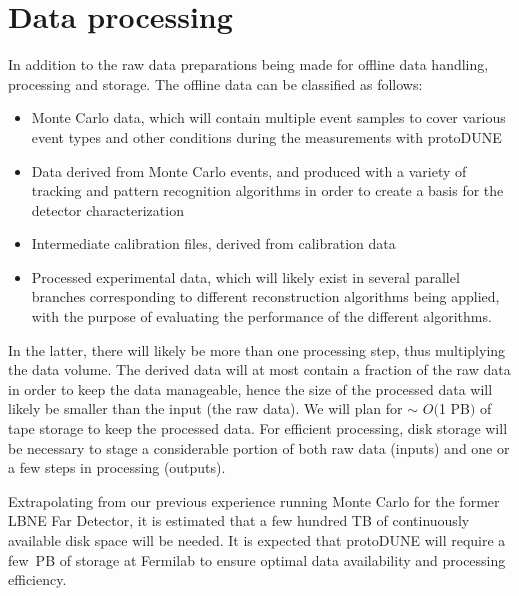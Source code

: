 \documentclass[12pt]{article}
\begin{document}
\section{Data processing}
\label{sec:protodune-dataprocess}

In addition to the raw data preparations being made for offline data handling, processing and storage.
The offline data can be classified as follows:
\begin{itemize}
\item Monte Carlo data, which will contain multiple event samples to cover various event types and other conditions during the measurements
with protoDUNE

\item Data derived from Monte Carlo events, and produced with a variety of tracking and pattern recognition algorithms
in order to create a basis for the detector characterization

\item Intermediate calibration files, derived from calibration data

\item Processed experimental data, which will likely exist in several parallel branches corresponding to different reconstruction
algorithms being applied, with the purpose of evaluating the performance of the different algorithms.
\end{itemize}

\noindent In the latter, there will likely be more than one processing step, thus multiplying the data volume. 
The derived data will at most contain a fraction of the raw data in order to keep the data manageable,
hence the size of the processed data will likely be smaller than the input (the raw data). 
We will plan for $\sim$ $O($1 PB$)$ of tape storage to keep the processed data. 
For efficient processing, disk storage will be necessary to stage a considerable portion of both raw
data (inputs) and one or a few steps in processing (outputs).

Extrapolating from our previous experience running Monte Carlo for the former LBNE Far Detector, it is estimated
that  a few hundred TB of continuously available disk space will be needed. It is expected that protoDUNE will require
a few~PB of storage at Fermilab to ensure optimal data availability and  processing efficiency. 
\end{document}
